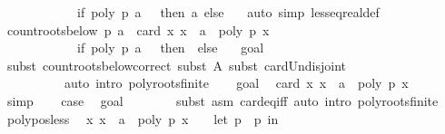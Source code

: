 \begin{isabellebody}
\ \ \ \ \ \ \ \ \ \ \ \ {\isacharparenleft}if\ poly\ p\ a\ {\isacharequal}\ {}\ then\ {\isacharbraceleft}a{\isacharbraceright}\ else\ {\isacharbraceleft}{\isacharbraceright}{\isacharparenright}{\isachardoublequoteclose}\ \isamarkupfalse%
\ {\isacharparenleft}auto\ simp{\isacharcolon}\ less{\isacharunderscore}eq{\isacharunderscore}real{\isacharunderscore}def{\isacharparenright}\isanewline
\ \ \isamarkupfalse%
\ {\isachardoublequoteopen}count{\isacharunderscore}roots{\isacharunderscore}below\ p\ a\ {\isacharequal}\ card\ {\isacharbraceleft}x{\isachardot}\ x\ {\isacharless}\ a\ {\isasymand}\ poly\ p\ x\ {\isacharequal}\ {}{\isacharbraceright}\ {\isacharplus}\isanewline
\ \ \ \ \ \ \ \ \ \ \ \ {\isacharparenleft}if\ poly\ p\ a\ {\isacharequal}\ {}\ then\ {}\ else\ {}{\isacharparenright}{\isachardoublequoteclose}\ \isamarkupfalse%
\ goal{}\isanewline
\ \ \ \ \ \ \isamarkupfalse%
\ {\isacharparenleft}subst\ count{\isacharunderscore}roots{\isacharunderscore}below{\isacharunderscore}correct{\isacharcomma}\ subst\ A{\isacharcomma}\ subst\ card{\isacharunderscore}Un{\isacharunderscore}disjoint{\isacharcomma}\isanewline
\ \ \ \ \ \ \ \ \ \ auto\ intro{\isacharcolon}\ poly{\isacharunderscore}roots{\isacharunderscore}finite{\isacharparenright}\isanewline
\ \ \isamarkupfalse%
\ goal{}\ \isamarkupfalse%
\ {\isachardoublequoteopen}card\ {\isacharbraceleft}x{\isachardot}\ x\ {\isacharless}\ a\ {\isasymand}\ poly\ p\ x\ {\isacharequal}\ {}{\isacharbraceright}\ {\isacharequal}\ {}{\isachardoublequoteclose}\ \isamarkupfalse%
\ simp\isanewline
\ \ \isamarkupfalse%
\ {\isacharquery}case\ \isamarkupfalse%
\ goal{}\isanewline
\ \ \ \ \ \ \isamarkupfalse%
\ {\isacharparenleft}subst\ {\isacharparenleft}asm{\isacharparenright}\ card{\isacharunderscore}eq{\isacharunderscore}{}{\isacharunderscore}iff{\isacharcomma}\ auto\ intro{\isacharcolon}\ poly{\isacharunderscore}roots{\isacharunderscore}finite{\isacharparenright}\isanewline
{}\isamarkupfalse%
%
\endisatagproof
{\isafoldproof}%
%
\isadelimproof
\isanewline
%
\endisadelimproof
\isanewline
{}\isamarkupfalse%
\ poly{\isacharunderscore}pos{\isacharunderscore}less{\isacharcolon}\isanewline
\ \ {\isachardoublequoteopen}{\isacharparenleft}{\isasymforall}x{\isachardot}\ x\ {\isacharless}\ a\ {\isasymlongrightarrow}\ poly\ p\ x\ {\isachargreater}\ {}{\isacharparenright}\ {\isasymlongleftrightarrow}\ {\isacharparenleft}let\ p\ {\isacharequal}\ p\ in\isanewline

\end{isabellebody}
